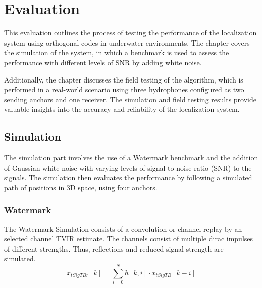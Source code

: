 \chapter{Evaluation}
This evaluation outlines the process of testing the performance of the localization system using orthogonal codes in underwater environments. The chapter covers the simulation of the system, in which a benchmark is used to assess the performance with different levels of SNR by adding white noise. 

Additionally, the chapter discusses the field testing of the algorithm, which is performed in a real-world scenario using three hydrophones configured as two sending anchors and one receiver. The simulation and field testing results provide valuable insights into the accuracy and reliability of the localization system.
\section{Simulation}
The simulation part involves the use of a Watermark benchmark \cite{watermark15} and the addition of Gaussian white noise with varying levels of signal-to-noise ratio (SNR) to the signals. The simulation then evaluates the performance by following a simulated path of positions in 3D space, using four anchors.
\subsection{Watermark}
The Watermark Simulation consists of a convolution or channel replay by an selected channel TVIR estimate. The channels consist of multiple dirac impulses of different strengths. Thus, reflections and reduced signal strength are simulated.\
\begin{equation}
	x_{tSigTBr}[k]=\sum_{i=0}^{N}h[k,i]\cdot x_{tSigTB}[k-i]
\end{equation}

